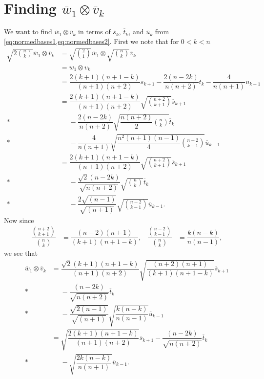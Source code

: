 \section{\texorpdfstring{Finding $\overline w_1\otimes\overline v_k$}{Finding the normed version of w\_1 tensor v\_1}}\label{sec:barw_1tensorbarv_k}

We want to find $\overline w_1\otimes\overline v_k$ in terms of $\overline s_k$, $\overline t_k$, and $\overline u_k$ from \cref{eq:normedbases1,eq:normedbases2}. First we note that for $0<k<n$
\begin{align*}
  \sqrt{2\binom{n}{k}}\overline w_1\otimes\overline v_k &= \sqrt{\binom{2}{1}}\overline w_1\otimes \sqrt{\binom{n}{k}}\overline v_k \\
                                                        &= w_1\otimes v_k \\
                                                        &= \dfrac{2(k+1)(n+1-k)}{(n+1)(n+2)}s_{k+1} - \dfrac{2(n-2k)}{n(n+2)}t_k - \dfrac{4}{n(n+1)}u_{k-1} \\
                                                        &= \dfrac{2(k+1)(n+1-k)}{(n+1)(n+2)}\sqrt{\binom{n+2}{k+1}}\overline s_{k+1}\\*
  &\phantom{{}={}}{}- \dfrac{2(n-2k)}{n(n+2)}\sqrt{\dfrac{n(n+2)}{2}\binom{n}{k}}\overline t_k \\*
                                                        &\phantom{{}={}}{} - \dfrac{4}{n(n+1)}\sqrt{\dfrac{n^2(n+1)(n-1)}{4}\binom{n-2}{k-1}}\overline u_{k-1} \\
                                                        &= \dfrac{2(k+1)(n+1-k)}{(n+1)(n+2)}\sqrt{\binom{n+2}{k+1}}\overline s_{k+1} \\*
  &\phantom{{}={}}{} - \dfrac{\sqrt{2}(n-2k)}{\sqrt{n(n+2)}}\sqrt{\binom{n}{k}}\overline t_k \\*
  &\phantom{{}={}}{} - \dfrac{2\sqrt{(n-1)}}{\sqrt{(n+1)}}\sqrt{\binom{n-2}{k-1}}\overline u_{k-1}.                                                
\end{align*}
Now since
\begin{align*}
  \dfrac{\binom{n+2}{k+1}}{\binom{n}{k}} &= \dfrac{(n+2)(n+1)}{(k+1)(n+1-k)}, & \dfrac{\binom{n-2}{k-1}}{\binom{n}{k}} &= \dfrac{k(n-k)}{n(n-1)},
\end{align*}
we see that
\begin{align*}
  \overline w_1\otimes\overline v_k &= \dfrac{\sqrt{2}(k+1)(n+1-k)}{(n+1)(n+2)}\sqrt{\dfrac{(n+2)(n+1)}{(k+1)(n+1-k)}}\overline s_{k+1} \\*
  &\phantom{{}={}}{} - \dfrac{(n-2k)}{\sqrt{n(n+2)}}\overline t_k \\*
                                    &\phantom{{}={}}{} - \dfrac{\sqrt{2(n-1)}}{\sqrt{(n+1)}}\sqrt{\dfrac{k(n-k)}{n(n-1)}}\overline u_{k-1} \\
  &= \sqrt{\dfrac{2(k+1)(n+1-k)}{(n+1)(n+2)}}\overline s_{k+1} - \dfrac{(n-2k)}{\sqrt{n(n+2)}}\overline t_k \\*
  &\phantom{{}={}}{} - \sqrt{\dfrac{2k(n-k)}{n(n+1)}}\overline u_{k-1}.
\end{align*}
